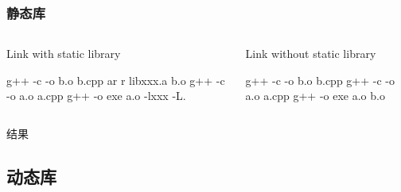 \documentclass[UTF8,lualatex]{ctexbeamer}
\begin{document}

\begin{frame}[fragile,t]
    \frametitle{静态库}
    \begin{columns}[t]
        \begin{column}{.45\textwidth}
            \begin{block}{Link with static library}
                \begin{bashcode}
                    g++ -c -o b.o b.cpp
                    ar r libxxx.a b.o
                    g++ -c -o a.o a.cpp
                    g++ -o exe a.o -lxxx -L.
                \end{bashcode}
            \end{block}
        \end{column}
        \begin{column}{.45\textwidth}
            \begin{block}{Link without static library}
                \begin{bashcode}
                    g++ -c -o b.o b.cpp
                    g++ -c -o a.o a.cpp
                    g++ -o exe a.o b.o
                \end{bashcode}
            \end{block}
        \end{column}
    \end{columns}
    \begin{block}{结果}
    \end{block}
\end{frame}


\subsection{动态库}
\end{document}
